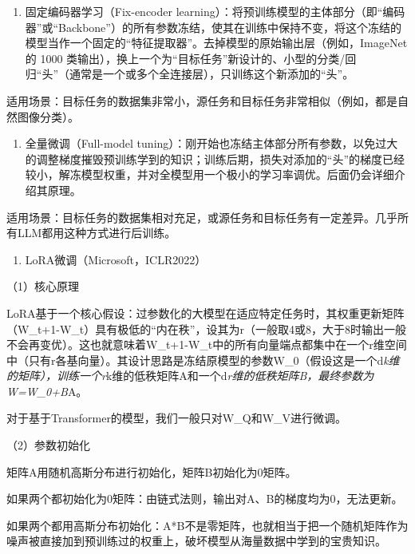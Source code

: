 \begin{enumerate}
\def\labelenumi{\arabic{enumi}.}
\tightlist
\item
  固定编码器学习（Fix-encoder learning）：将预训练模型的主体部分（即``编码器''或``Backbone''）的所有参数冻结，使其在训练中保持不变，将这个冻结的模型当作一个固定的``特征提取器''。去掉模型的原始输出层（例如，ImageNet 的 1000 类输出），换上一个为``目标任务''新设计的、小型的分类/回归``头''（通常是一个或多个全连接层），只训练这个新添加的``头''。
\end{enumerate}

适用场景：目标任务的数据集非常小，源任务和目标任务非常相似（例如，都是自然图像分类）。

\begin{enumerate}
\def\labelenumi{\arabic{enumi}.}
\setcounter{enumi}{1}
\tightlist
\item
  全量微调（Full-model tuning）：刚开始也冻结主体部分所有参数，以免过大的调整梯度摧毁预训练学到的知识；训练后期，损失对添加的``头''的梯度已经较小，解冻模型权重，并对全模型用一个极小的学习率调优。后面仍会详细介绍其原理。
\end{enumerate}

适用场景：目标任务的数据集相对充足，或源任务和目标任务有一定差异。几乎所有LLM都用这种方式进行后训练。

\begin{enumerate}
\def\labelenumi{\arabic{enumi}.}
\setcounter{enumi}{2}
\tightlist
\item
  LoRA微调（Microsoft，ICLR2022）
\end{enumerate}

（1）核心原理

LoRA基于一个核心假设：过参数化的大模型在适应特定任务时，其权重更新矩阵（W\_t+1-W\_t）具有极低的``内在秩''，设其为r（一般取4或8，大于8时输出一般不会再变优）。这也就意味着W\_t+1-W\_t中的所有向量端点都集中在一个r维空间中（只有r各基向量）。其设计思路是冻结原模型的参数W\_0（假设这是一个d\emph{k维的矩阵），训练一个r}k维的低秩矩阵A和一个d\emph{r维的低秩矩阵B，最终参数为W=W\_0+B}A。

对于基于Transformer的模型，我们一般只对W\_Q和W\_V进行微调。

（2）参数初始化

矩阵A用随机高斯分布进行初始化，矩阵B初始化为0矩阵。

如果两个都初始化为0矩阵：由链式法则，输出对A、B的梯度均为0，无法更新。

如果两个都用高斯分布初始化：A*B不是零矩阵，也就相当于把一个随机矩阵作为噪声被直接加到预训练过的权重上，破坏模型从海量数据中学到的宝贵知识。

